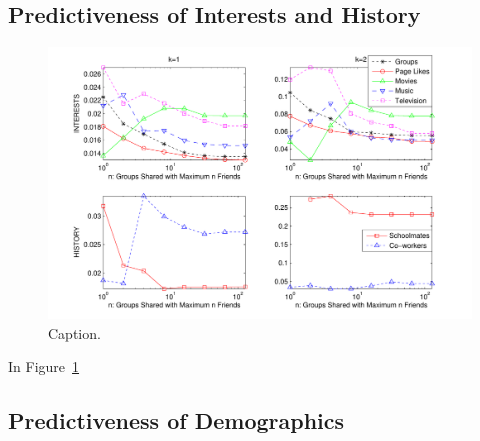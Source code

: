 \subsection{Predictiveness of Interests and History}

\label{sec:interest_history}

\begin{figure}[t!]
\centering
\includegraphics[scale=0.80]{data/interests_fix}
\vspace{-5mm}
\caption{Caption.}
\label{fig:res5}
\end{figure}

In Figure~\ref{fig:res5}


\subsection{Predictiveness of Demographics}

\label{sec:demographics}

